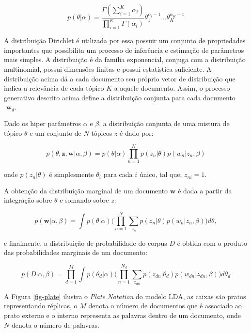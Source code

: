 \documentclass[12pt,a4paper]{article}
\begin{document}
  \begin{equation}
  p(\theta|\alpha) = \frac{\Gamma(\displaystyle\sum_{i=1}^{K} \alpha _i)}{\displaystyle\prod_{i=1}^{K} \Gamma(\alpha _i)} \theta _1 ^{\alpha _i - 1} ...  \theta _K ^{\alpha _K - 1}
  \end{equation}
  
  A distribuição Dirichlet é utilizada por essa possuir um conjunto de propriedades importantes que possibilita um processo de inferência e estimação de parâmetros mais simples.
   A distribuição é da família exponencial, conjuga com a distribuição multinomial, possui dimensões finitas e possui estatística suficiente.
   A distribuição  acima dá a cada documento seu próprio vetor de distribuição que indica a relevância de cada tópico $K$ a aquele documento.
   Assim, o processo generativo descrito acima define a distribuição conjunta para cada documento $\textbf{ w}_d$.
  
  Dado os hiper parâmetros $\alpha$ e $\beta$, a distribuição conjunta de uma mistura de tópico $\theta$ e um conjunto de $N$ tópicos $z$ é dado por:
  
  \begin{equation}
  p(\theta,\textbf{z},\textbf{w}|\alpha,\beta) = p(\theta|\alpha) \prod_{n=1}^{N} p(z_n|\theta)p(w_n|z_n,\beta)
  \end{equation}
  
  onde $p(z_n | \theta)$ é simplesmente $\theta _i$ para cada $i$ único,
   tal que, $z_{ni}=1$.
   
  A obtenção da distribuição marginal de um documento $\textbf{w}$ é dada a partir da integração sobre $\theta$ e somando sobre $z$:
  
  \begin{equation}
  p(\textbf{w}|\alpha,\beta)=\int{p(\theta|\alpha)\Bigg(\prod_{n=1}^{N}\sum_{z_n} p(z_n|\theta)p(w_n|z_n,\beta)\Bigg)d\theta},
  \end{equation}
  
  e finalmente, a distribuição de probabilidade do corpus $D$ é obtida com o produto das probabilidades marginais de um documento:
  
  \begin{equation}
  p(D|\alpha,\beta)= \prod_{d=1}^{M} \int{p(\theta _d|\alpha)\Bigg(\prod_{n=1}^{N_d}\sum_{z_{dn}} p(z_{dn}|\theta _d)p(w_{dn}|z_{dn},\beta)\Bigg)d\theta _d}
  \end{equation}
  
  
  A Figura \ref{fig-plate} ilustra o 	\textit{Plate Notation} do modelo LDA, as caixas são pratos representando réplicas,
  o $M$ denota o número de documentos que é associado ao prato externo e o interno representa as palavras dentro de um documento, onde $N$ denota o número de palavras.
  
\end{document}
